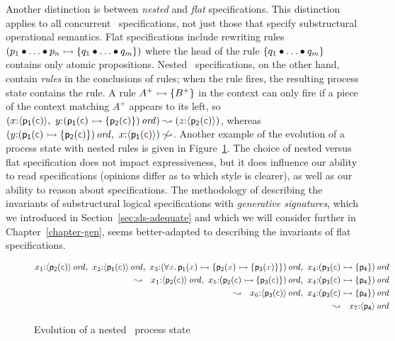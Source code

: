 Another
distinction is between  {\it nested} and {\it flat}
specifications. This distinction applies to all concurrent
\sls~specifications, not just those that specify substructural
operational semantics. Flat
specifications include rewriting rules $\left( p_1 \mathbin{\bullet} \ldots \mathbin{\bullet}
  p_n \rightarrowtail \{ q_1 \mathbin{\bullet} \ldots \mathbin{\bullet} q_m \} \right)$ where the head
of the rule $\{ q_1 \mathbin{\bullet} \ldots \mathbin{\bullet} q_m \}$ contains only atomic
propositions. Nested \sls~specifications, on the other hand,
contain {\it rules} in the conclusions of rules; when the rule fires,
the resulting process state contains the rule. 
A rule $A^+ \rightarrowtail \{ B^+ \}$ in the context can only fire if a piece 
of the context
matching $A^+$ appears to its left, so  $\left(x{:}\susp{\sf p_1(\lf{c})}, ~
y{:}\istrue{\left( {\sf p_1(\lf{c})} \lefti \{ {\sf p_2(\lf{c})} \} \right)}\right)
\leadsto \left(z{:}\susp{\sf p_2(\lf{c})}\right)$, whereas 
$\left(y{:}\istrue{\left( {\sf p_1(\lf{c})} \lefti \{ {\sf p_2(\lf{c})} \} \right)},~
x{:}\susp{\sf p_1(\lf{c})}\right)
\not \leadsto$. Another example of the evolution of a 
process state with nested rules is given 
in Figure~\ref{fig:ho-evo-ex}.
%
The choice of nested versus flat specification does not impact
expressiveness, but it does influence our ability to read
specifications (opinions differ as to which style is clearer), as well
as our ability to reason about specifications. The methodology of
describing the invariants of substructural logical specifications with
{\it generative signatures}, which we introduced in
Section~\ref{sec:sls-adequate} and which we will consider further in
Chapter~\ref{chapter-gen}, 
seems better-adapted to describing the invariants of flat
specifications.

\begin{figure}[t]
{\small \begin{align*}
x_1{:}\istrue{\susp{{\sf p_2}(\lf{\sf c})}}, ~
x_2{:}\istrue{\susp{{\sf p_1}(\lf{\sf c})}}, ~
x_3{:}\istrue{(\forall \lf{x}.\,{\sf p_1}(\lf{x}) 
                \lefti \{ {\sf p_2}(\lf{x}) \lefti \{ {\sf p_3}(\lf{x}) \} \})}, ~
x_4{:}\istrue{({\sf p_3}(\lf{\sf c}) \lefti \{ {\sf p_4} \})} & \\
\leadsto ~~ 
x_1{:}\istrue{\susp{{\sf p_2}(\lf{\sf c})}}, ~
x_5{:}\istrue{({\sf p_2}(\lf{\sf c}) \lefti \{ {\sf p_3}(\lf{\sf c}) \})}, ~
x_4{:}\istrue{({\sf p_3}(\lf{\sf c}) \lefti \{ {\sf p_4} \})} & \\
\leadsto ~~ 
x_6{:}\istrue{\susp{{\sf p_3}(\lf{\sf c})}}, ~
x_4{:}\istrue{({\sf p_3}(\lf{\sf c}) \lefti \{ {\sf p_4} \})} & \\
\leadsto ~~ 
x_7{:}\istrue{\susp{{\sf p_4}}} & 
\end{align*}}\vspace{-18pt}
\caption{Evolution of a nested \sls~process state}
\label{fig:ho-evo-ex}
\end{figure}

